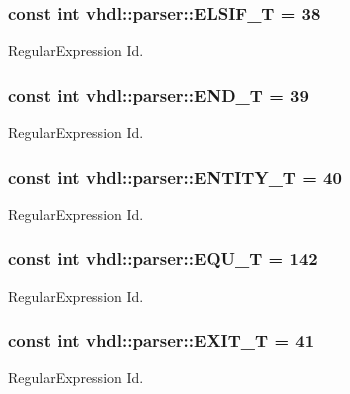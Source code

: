 \subsubsection[{E\+L\+S\+I\+F\+\_\+\+T}]{\setlength{\rightskip}{0pt plus 5cm}const int vhdl\+::parser\+::\+E\+L\+S\+I\+F\+\_\+\+T = 38}\label{namespacevhdl_1_1parser_a7fcde94ed0a6fa20307d7eb936ef9ced}
Regular\+Expression Id. \hypertarget{namespacevhdl_1_1parser_aa6c398f1f3c95a14b36690fb1d4e717e}{}
\subsubsection[{E\+N\+D\+\_\+\+T}]{\setlength{\rightskip}{0pt plus 5cm}const int vhdl\+::parser\+::\+E\+N\+D\+\_\+\+T = 39}\label{namespacevhdl_1_1parser_aa6c398f1f3c95a14b36690fb1d4e717e}
Regular\+Expression Id. \hypertarget{namespacevhdl_1_1parser_a9f4d84b5666fb7a6042ad009e9c73f03}{}
\subsubsection[{E\+N\+T\+I\+T\+Y\+\_\+\+T}]{\setlength{\rightskip}{0pt plus 5cm}const int vhdl\+::parser\+::\+E\+N\+T\+I\+T\+Y\+\_\+\+T = 40}\label{namespacevhdl_1_1parser_a9f4d84b5666fb7a6042ad009e9c73f03}
Regular\+Expression Id. \hypertarget{namespacevhdl_1_1parser_ab711ada32fee36fd239f1ceac007bdbc}{}
\subsubsection[{E\+Q\+U\+\_\+\+T}]{\setlength{\rightskip}{0pt plus 5cm}const int vhdl\+::parser\+::\+E\+Q\+U\+\_\+\+T = 142}\label{namespacevhdl_1_1parser_ab711ada32fee36fd239f1ceac007bdbc}
Regular\+Expression Id. \hypertarget{namespacevhdl_1_1parser_a9a883b1e0a204e9aeff9b659ece49d88}{}
\subsubsection[{E\+X\+I\+T\+\_\+\+T}]{\setlength{\rightskip}{0pt plus 5cm}const int vhdl\+::parser\+::\+E\+X\+I\+T\+\_\+\+T = 41}\label{namespacevhdl_1_1parser_a9a883b1e0a204e9aeff9b659ece49d88}
Regular\+Expression Id. \hypertarget{namespacevhdl_1_1parser_a6a6b17519585a72d65436b2b57a2f9ba}{}

